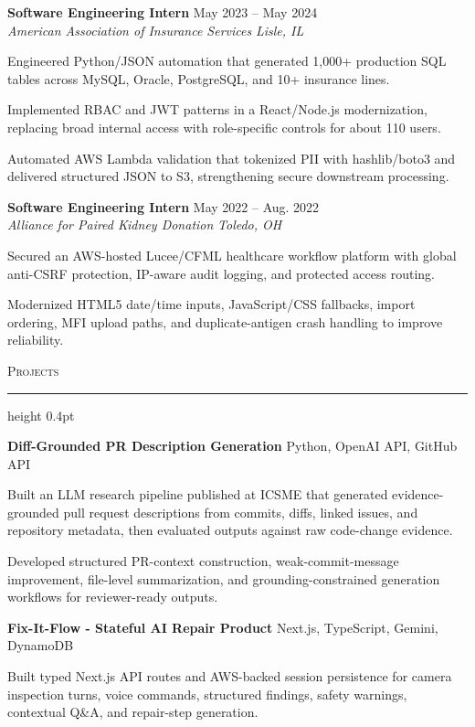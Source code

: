 \documentclass[letterpaper,11pt]{article}
\newcommand{\resumesection}[1]{%
  \par\vspace{2pt}%
  {\large\scshape #1}\par\vspace{2pt}%
  \hrule height 0.4pt\vspace{2pt}%
}
\newcommand{\resumeSubheading}[4]{
  \textbf{#1} \hfill #2\\
  \textit{#3} \hfill \textit{#4}
}
\newcommand{\projectHeading}[2]{
  \textbf{#1} \hfill #2
}
\begin{document}
\resumeSubheading
{Software Engineering Intern}{May 2023 -- May 2024}
{American Association of Insurance Services}{Lisle, IL}
\begin{tightitemize}
  \item Engineered Python/JSON automation that generated 1,000+ production SQL tables across MySQL, Oracle, PostgreSQL, and 10+ insurance lines.
  \item Implemented RBAC and JWT patterns in a React/Node.js modernization, replacing broad internal access with role-specific controls for about 110 users.
  \item Automated AWS Lambda validation that tokenized PII with hashlib/boto3 and delivered structured JSON to S3, strengthening secure downstream processing.
\end{tightitemize}

\resumeSubheading
{Software Engineering Intern}{May 2022 -- Aug. 2022}
{Alliance for Paired Kidney Donation}{Toledo, OH}
\begin{tightitemize}
  \item Secured an AWS-hosted Lucee/CFML healthcare workflow platform with global anti-CSRF protection, IP-aware audit logging, and protected access routing.
  \item Modernized HTML5 date/time inputs, JavaScript/CSS fallbacks, import ordering, MFI upload paths, and duplicate-antigen crash handling to improve reliability.
\end{tightitemize}

\resumesection{Projects}
\projectHeading{Diff-Grounded PR Description Generation}{Python, OpenAI API, GitHub API}
\begin{tightitemize}
  \item Built an LLM research pipeline published at ICSME that generated evidence-grounded pull request descriptions from commits, diffs, linked issues, and repository metadata, then evaluated outputs against raw code-change evidence.
  \item Developed structured PR-context construction, weak-commit-message improvement, file-level summarization, and grounding-constrained generation workflows for reviewer-ready outputs.
\end{tightitemize}

\projectHeading{Fix-It-Flow - Stateful AI Repair Product}{Next.js, TypeScript, Gemini, DynamoDB}
\begin{tightitemize}
  \item Built typed Next.js API routes and AWS-backed session persistence for camera inspection turns, voice commands, structured findings, safety warnings, contextual Q\&A, and repair-step generation.
\end{tightitemize}
\end{document}
